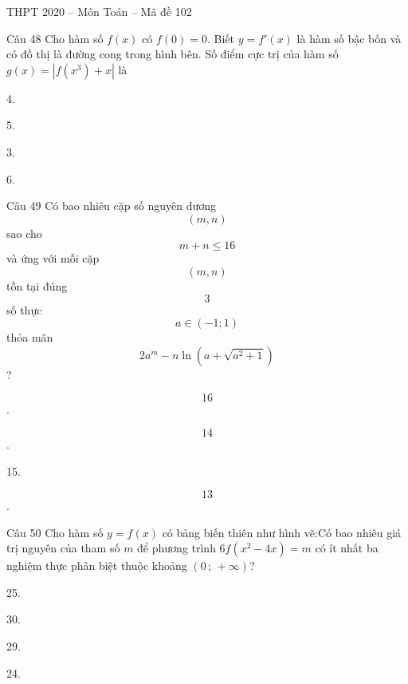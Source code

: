 \documentclass{book}
\begin{document}
\begin{quiz}{THPT 2020 – Môn Toán – Mã đề 102}
\begin{multi}[points=1]{Câu 48}
 Cho hàm số $f\left( x \right)$ có $f\left( 0 \right)=0$. Biết $y={f}'\left( x \right)$ là hàm số bậc bốn và có đồ thị là đường cong trong hình bên. Số điểm cực trị của hàm số $g\left( x \right)=\left| f\left( {{x}^{3}} \right)+x \right|$ là

\item  4.	
\item*  5.	
\item  3.	
\item  6.
\end{multi}

\begin{multi}[points=1]{Câu 49}
 Có bao nhiêu cặp số nguyên dương \[\left( m,n \right)\] sao cho \[m+n\le 16\] và ứng với mỗi cặp \[\left( m,n \right)\] tồn tại đúng \[3\] số thực \[a\in \left( -1;1 \right)\] thỏa mãn \[2{{a}^{m}}-n\ln \left( a+\sqrt{{{a}^{2}}+1} \right)\]? 

\item  \[16\].	
\item  \[14\].	
\item*  15.	
\item  \[13\].
\end{multi}

\begin{multi}[points=1]{Câu 50}
 Cho hàm số $y=f\left( x \right)$ có bảng biến thiên như hình vẽ:Có bao nhiêu giá trị nguyên của tham số $m$ để phương trình $6f\left( {{x}^{2}}-4x \right)=m$ có ít nhất ba nghiệm thực phân biệt thuộc khoảng $\left( 0\,;\,+\infty  \right)$? 

\item  25.	
\item  30.	
\item  29.	
\item*  24.
\end{multi}

\end{quiz}
\end{document}
